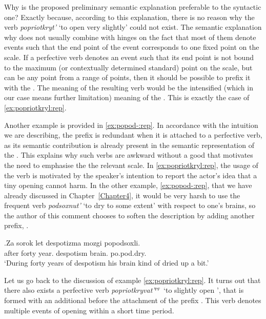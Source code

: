 Why is the proposed preliminary semantic explanation preferable to the syntactic one? Exactly because, according to this explanation, there is no reason why the verb \textit{popriotkryt'} `to open very slightly' could not exist. The semantic explanation why  does not usually combine with  hinges on the fact that most of them denote events such that the end point of the event corresponds to one fixed point on the scale. If a perfective verb denotes an event such that its end point is not bound to the maximum (or contextually determined standard) point on the scale, but can be any point from a range of points, then it should be possible to prefix it with the  . The meaning of the resulting verb would be the intensified (which in our case means further limitation) meaning of the . This is exactly the case of \ref{ex:popriotkryl:rep}.

Another example is provided in \ref{ex:popod-:rep}. In accordance with the intuition we are describing, the  prefix  is redundant when it is attached to a perfective verb, as its semantic contribution is already present in the semantic representation of the . This explains why such verbs are awkward without a good  that motivates the need to emphasise the  the relevant scale. In \ref{ex:popriotkryl:rep}, the usage of the verb is motivated by the speaker's intention to report the actor's idea that a tiny opening cannot harm. In the other example, \ref{ex:popod-:rep}, that we have already discussed in Chapter~\ref{Chapter4}, it would be very harsh to use the frequent verb \textit{podsoxnut'} `to dry to some extent' with respect to one's brains, so the author of this comment chooses to soften the description by adding another  prefix, . 

\exg.\label{ex:popod-:rep}Za sorok let despotizma mozgi popodsoxli.\\
after forty year. despotism brain. po.pod.dry.\\
\trans `During forty years of despotism his brain kind of dried up a bit.'\\

Let us go back to the discussion of example \ref{ex:popriotkryl:rep}. It turns out that there also exists a perfective verb \textit{popriotkryvat'}$^{\textsc{pf}}$ `to slightly open ', that is formed with an additional  before the attachment of the prefix . This verb denotes multiple events of opening within a short time period. 

